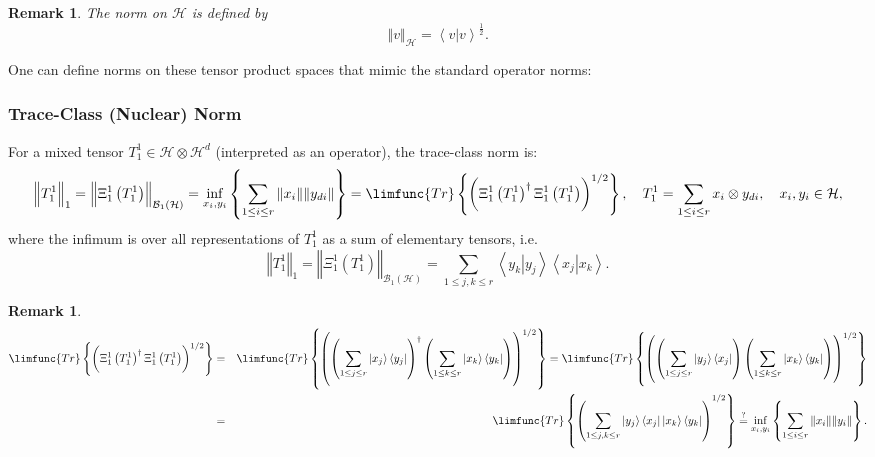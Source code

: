 \documentclass[aps,preprint]{revtex4}
\newtheorem{remark}[theorem]{Remark}
\begin{document}
\begin{remark}
The norm on $\mathcal{H}$ is defined by 
\begin{equation}
\left\Vert v\right\Vert _{\mathcal{H}}=\left\langle \left. \overset{}{v}%
\right\vert v\right\rangle ^{\frac{1}{2}}.
\end{equation}
\end{remark}

One can define norms on these tensor product spaces that mimic the standard
operator norms:

\subsubsection*{Trace-Class (Nuclear) Norm}

For a mixed tensor $T_{1}^{1}\in \mathcal{H}\otimes \mathcal{H}^{d}$
(interpreted as an operator), the trace-class norm is: 
\begin{equation*}
\left\Vert \overset{}{T_{1}^{1}}\right\Vert _{1}=\left\Vert \overset{}{\Xi
_{1}^{1}\left( T_{1}^{1}\right) }\right\Vert _{\mathcal{B}_{1}\left( 
\mathcal{H}\right) }=\inf_{x_{i},y_{i}}\left\{ \sum_{1\leq i\leq r}\Vert
x_{i}\Vert \Vert y_{di}\Vert \right\} =\limfunc{Tr}\left\{ \left( \overset{}{%
\Xi _{1}^{1}\left( T_{1}^{1}\right) ^{\dagger }\Xi _{1}^{1}\left(
T_{1}^{1}\right) }\right) ^{1/2}\right\} ,\quad T_{1}^{1}=\sum_{1\leq i\leq
r}x_{i}\otimes y_{di},\quad x_{i},y_{i}\in \mathcal{H},
\end{equation*}%
where the infimum is over all representations of $T_{1}^{1}$ as a sum of
elementary tensors, i.e. 
\begin{equation}
\left\Vert \overset{}{T_{1}^{1}}\right\Vert _{1}=\left\Vert \overset{}{\Xi
_{1}^{1}\left( T_{1}^{1}\right) }\right\Vert _{\mathcal{B}_{1}\left( 
\mathcal{H}\right) }=\sum_{1\leq j,k\leq r}\left\langle \left.
y_{k}\right\vert y_{j}\right\rangle \left\langle \left. x_{j}\right\vert
x_{k}\right\rangle .
\end{equation}

\begin{remark}
\begin{eqnarray}
\limfunc{Tr}\left\{ \left( \overset{}{\Xi _{1}^{1}\left( T_{1}^{1}\right)
^{\dagger }\Xi _{1}^{1}\left( T_{1}^{1}\right) }\right) ^{1/2}\right\} &=&%
\limfunc{Tr}\left\{ \left( \overset{}{\left( \sum_{1\leq j\leq r}\left\vert
x_{j}\right\rangle \left\langle y_{j}\right\vert \right) ^{\dagger }\left(
\sum_{1\leq k\leq r}\left\vert x_{k}\right\rangle \left\langle
y_{k}\right\vert \right) }\right) ^{1/2}\right\} =\limfunc{Tr}\left\{ \left( 
\overset{}{\left( \sum_{1\leq j\leq r}\left\vert y_{j}\right\rangle
\left\langle x_{j}\right\vert \right) \left( \sum_{1\leq k\leq r}\left\vert
x_{k}\right\rangle \left\langle y_{k}\right\vert \right) }\right)
^{1/2}\right\} \\
&=&\limfunc{Tr}\left\{ \overset{}{\left( \sum_{1\leq j,k\leq r}\left\vert
y_{j}\right\rangle \left\langle x_{j}\right\vert \left\vert
x_{k}\right\rangle \left\langle y_{k}\right\vert \right) }^{1/2}\right\} 
\overset{?}{=}\inf_{x_{i},y_{i}}\left\{ \sum_{1\leq i\leq r}\Vert x_{i}\Vert
\Vert y_{i}\Vert \right\} .
\end{eqnarray}
\end{remark}
\end{document}
